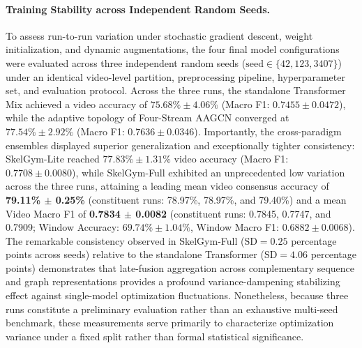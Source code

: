 \documentclass[runningheads]{llncs}
\begin{document}
\paragraph{Training Stability across Independent Random Seeds.}
To assess run-to-run variation under stochastic gradient descent, weight initialization, and dynamic augmentations, the four final model configurations were evaluated across three independent random seeds ($\text{seed} \in \{42, 123, 3407\}$) under an identical video-level partition, preprocessing pipeline, hyperparameter set, and evaluation protocol. Across the three runs, the standalone Transformer Mix achieved a video accuracy of $75.68\% \pm 4.06\%$ (Macro F1: $0.7455 \pm 0.0472$), while the adaptive topology of Four-Stream AAGCN converged at $77.54\% \pm 2.92\%$ (Macro F1: $0.7636 \pm 0.0346$). Importantly, the cross-paradigm ensembles displayed superior generalization and exceptionally tighter consistency: SkelGym-Lite reached $77.83\% \pm 1.31\%$ video accuracy (Macro F1: $0.7708 \pm 0.0080$), while SkelGym-Full exhibited an unprecedented low variation across the three runs, attaining a leading mean video consensus accuracy of \textbf{79.11\% $\pm$ 0.25\%} (constituent runs: 78.97\%, 78.97\%, and 79.40\%) and a mean Video Macro F1 of \textbf{0.7834 $\pm$ 0.0082} (constituent runs: 0.7845, 0.7747, and 0.7909; Window Accuracy: $69.74\% \pm 1.04\%$, Window Macro F1: $0.6882 \pm 0.0068$). The remarkable consistency observed in SkelGym-Full ($\text{SD} = 0.25$ percentage points across seeds) relative to the standalone Transformer ($\text{SD} = 4.06$ percentage points) demonstrates that late-fusion aggregation across complementary sequence and graph representations provides a profound variance-dampening stabilizing effect against single-model optimization fluctuations. Nonetheless, because three runs constitute a preliminary evaluation rather than an exhaustive multi-seed benchmark, these measurements serve primarily to characterize optimization variance under a fixed split rather than formal statistical significance.
\end{document}
